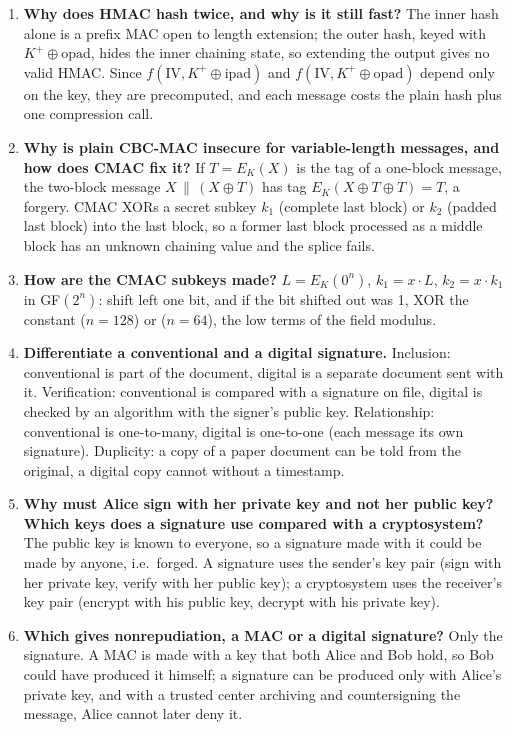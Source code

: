 \begin{enumerate}[leftmargin=1.6em,itemsep=3pt]
  \item \textbf{Why does HMAC hash twice, and why is it still fast?} The inner hash alone is a prefix MAC open to length extension; the outer hash, keyed with $K^+ \oplus \mathrm{opad}$, hides the inner chaining state, so extending the output gives no valid HMAC. Since $f(\mathrm{IV}, K^+ \oplus \mathrm{ipad})$ and $f(\mathrm{IV}, K^+ \oplus \mathrm{opad})$ depend only on the key, they are precomputed, and each message costs the plain hash plus one compression call.
  \item \textbf{Why is plain CBC-MAC insecure for variable-length messages, and how does CMAC fix it?} If $T = E_K(X)$ is the tag of a one-block message, the two-block message $X \,\|\, (X \oplus T)$ has tag $E_K(X \oplus T \oplus T) = T$, a forgery. CMAC XORs a secret subkey $k_1$ (complete last block) or $k_2$ (padded last block) into the last block, so a former last block processed as a middle block has an unknown chaining value and the splice fails.
  \item \textbf{How are the CMAC subkeys made?} $L = E_K(0^n)$, $k_1 = x \cdot L$, $k_2 = x \cdot k_1$ in GF$(2^n)$: shift left one bit, and if the bit shifted out was 1, XOR the constant  ($n = 128$) or  ($n = 64$), the low terms of the field modulus.
  \item \textbf{Differentiate a conventional and a digital signature.} Inclusion: conventional is part of the document, digital is a separate document sent with it. Verification: conventional is compared with a signature on file, digital is checked by an algorithm with the signer's public key. Relationship: conventional is one-to-many, digital is one-to-one (each message its own signature). Duplicity: a copy of a paper document can be told from the original, a digital copy cannot without a timestamp.
  \item \textbf{Why must Alice sign with her private key and not her public key? Which keys does a signature use compared with a cryptosystem?} The public key is known to everyone, so a signature made with it could be made by anyone, i.e.\ forged. A signature uses the sender's key pair (sign with her private key, verify with her public key); a cryptosystem uses the receiver's key pair (encrypt with his public key, decrypt with his private key).
  \item \textbf{Which gives nonrepudiation, a MAC or a digital signature?} Only the signature. A MAC is made with a key that both Alice and Bob hold, so Bob could have produced it himself; a signature can be produced only with Alice's private key, and with a trusted center archiving and countersigning the message, Alice cannot later deny it.

\end{enumerate}
